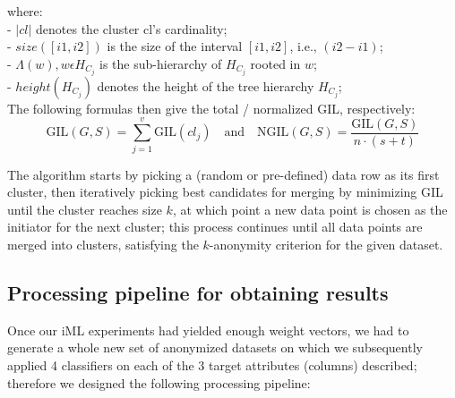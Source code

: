 \documentclass{llncs}
\providecommand{\abs}[1]{\lvert#1\rvert}
\begin{document}
where:\\
- $\abs{cl}$ denotes the cluster cl's cardinality; \\
- $size([i1,i2])$ is the size of the interval $[i1,i2]$, i.e., $(i2-i1)$; \\
- $\Lambda(w), w \epsilon H_{C_j}$ is the sub-hierarchy of $H_{C_j}$ rooted in $w$; \\
- $height(H_{C_j})$ denotes the height of the tree hierarchy $H_{C_j}$; \\


The following formulas then give the total / normalized GIL, respectively:
\begin{equation*}
\text{GIL}(G,S) = \sum_{j=1}^{v} \text{GIL}(cl_j) \quad \textrm{and} \quad
\text{NGIL}(G,S) = \frac{\text{GIL}(G,S)}{n \cdot (s+t)}
\end{equation*}

The algorithm starts by picking a (random or pre-defined) data row as its first cluster, then iteratively picking best candidates for merging by minimizing GIL until the cluster reaches size $k$, at which point a new data point is chosen as the initiator for the next cluster; this process continues until all data points are merged into clusters, satisfying the $k$-anonymity criterion for the given dataset.


\subsection{Processing pipeline for obtaining results}
\label{ssect:process}

Once our iML experiments had yielded enough weight vectors, we had to generate a whole new set of anonymized datasets on which we subsequently applied 4 classifiers on each of the 3 target attributes (columns) described; therefore we designed the following processing pipeline:
\end{document}
